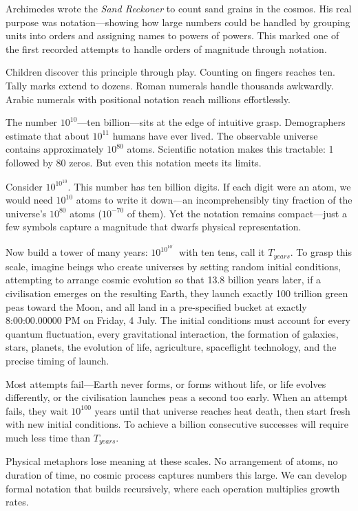 Archimedes wrote the \emph{Sand Reckoner} to count sand grains in the cosmos. His real purpose was notation—showing how large numbers could be handled by grouping units into \QSOpen{}orders\QSClose{} and assigning names to powers of powers. This marked one of the first recorded attempts to handle orders of magnitude through notation.

Children discover this principle through play. Counting on fingers reaches ten. Tally marks extend to dozens. Roman numerals handle thousands awkwardly. Arabic numerals with positional notation reach millions effortlessly.

The number $10^{10}$—ten billion—sits at the edge of intuitive grasp. Demographers estimate that about $10^{11}$ humans have ever lived. The observable universe contains approximately $10^{80}$ atoms. Scientific notation makes this tractable: \QSOpen{}1 followed by 80 zeros.\QSClose{} But even this notation meets its limits.

Consider $10^{10^{10}}$. This number has ten billion digits. If each digit were an atom, we would need $10^{10}$ atoms to write it down—an incomprehensibly tiny fraction of the universe's $10^{80}$ atoms ($10^{-70}$ of them). Yet the notation remains compact—just a few symbols capture a magnitude that dwarfs physical representation.

Now build a tower of many years: $10^{10^{10^{\cdot^{\cdot^{\cdot}}}}}$ with ten tens, call it $T_{years}$. To grasp this scale, imagine beings who create universes by setting random initial conditions, attempting to arrange cosmic evolution so that 13.8 billion years later, if a civilisation emerges on the resulting Earth, they launch exactly 100 trillion green peas toward the Moon, and all land in a pre-specified bucket at exactly 8:00:00.00000 PM on Friday, 4 July. The initial conditions must account for every quantum fluctuation, every gravitational interaction, the formation of galaxies, stars, planets, the evolution of life, agriculture, spaceflight technology, and the precise timing of launch.

Most attempts fail—Earth never forms, or forms without life, or life evolves differently, or the civilisation launches peas a second too early. When an attempt fails, they wait $10^{100}$ years until that universe reaches heat death, then start fresh with new initial conditions. To achieve a billion consecutive successes will require much less time than $T_{years}$.

Physical metaphors lose meaning at these scales. No arrangement of atoms, no duration of time, no cosmic process captures numbers this large. We can develop formal notation that builds recursively, where each operation multiplies growth rates.


